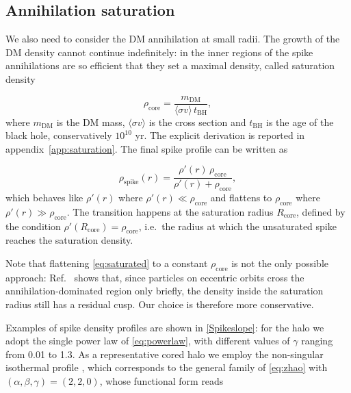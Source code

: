 \subsection{Annihilation saturation} \label{sec:saturation}

We also need to consider the DM annihilation at small radii. The growth of the DM density cannot continue indefinitely:
in the inner regions of the spike annihilations are so efficient that they set a maximal density, called saturation density

\begin{equation}
    \rho_{\mathrm{core}} = \frac{m_{\mathrm{DM}}}{\langle\sigma v\rangle\, t_{\mathrm{BH}}},
    \label{eq:rhocore}
\end{equation}
where $m_{\mathrm{DM}}$ is the DM mass, $\langle\sigma v\rangle$ is the cross section and $t_{\mathrm{BH}}$ is the age of the black hole, conservatively $10^{10}$ yr.
The explicit derivation is reported in appendix~\ref{app:saturation}.
The final spike profile can be written as

\begin{equation}
    \rho_{\mathrm{spike}}(r) = \frac{\rho'(r)\,\rho_{\mathrm{core}}}{\rho'(r) + \rho_{\mathrm{core}}},
    \label{eq:saturated}
\end{equation}
which behaves like $\rho'(r)$ where $\rho'(r) \ll
\rho_{\mathrm{core}}$ and flattens to $\rho_{\mathrm{core}}$ where $\rho'(r) \gg \rho_{\mathrm{core}}$.
The transition happens at the saturation radius $R_{\mathrm{core}}$, defined by
the condition $\rho'(R_{\mathrm{core}}) = \rho_{\mathrm{core}}$, i.e.\ the radius
at which the unsaturated spike reaches the saturation density.

Note that flattening \cref{eq:saturated} to a constant $\rho_{\mathrm{core}}$
is not the only possible approach: Ref.~\cite{ShapiroShelton2016} shows that,
since particles on
eccentric orbits cross the annihilation-dominated region only briefly,
the density inside the saturation radius still has a residual cusp.
Our choice is therefore more conservative.

Examples of spike density profiles are shown in \cref{Spikeslope}: 
for the halo we adopt the single power law of \cref{eq:powerlaw}, with different values of $\gamma$ ranging from 0.01 to 1.3.
As a representative cored halo we employ the non-singular isothermal profile \cite{Begeman1991}, which corresponds to the general family of \cref{eq:zhao} with $(\alpha,\beta,\gamma) = (2,2,0)$,
whose functional form reads

